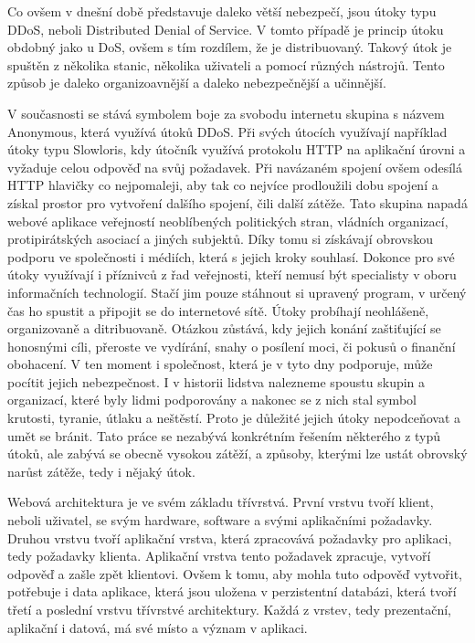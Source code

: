 \documentclass[12pt]{article}
\begin{document}
Co ovšem v dnešní době představuje daleko větší nebezpečí, jsou útoky typu DDoS, neboli Distributed Denial of Service. V tomto případě je princip útoku obdobný jako u DoS, ovšem s tím rozdílem, že je distribuovaný. Takový útok je spuštěn z několika stanic, několika uživateli a pomocí různých nástrojů. Tento způsob je daleko organizoavnější a daleko nebezpečnější a učinnější. \cite{dos}

V současnosti se stává symbolem boje za svobodu internetu skupina s názvem Anonymous, která využívá útoků DDoS. Při svých útocích využívají například útoky typu Slowloris, kdy útočník využívá protokolu HTTP na aplikační úrovni a vyžaduje celou odpověď na svůj požadavek. Při navázaném spojení ovšem odesílá HTTP hlavičky co nejpomaleji, aby tak co nejvíce prodloužili dobu spojení a získal prostor pro vytvoření dalšího spojení, čili další zátěže. Tato skupina napadá webové aplikace veřejností neoblíbených politických stran, vládních organizací, protipirátských asociací a jiných subjektů. Díky tomu si získávají obrovskou podporu ve společnosti i médiích, která s jejich kroky souhlasí. Dokonce pro své útoky využívají i příznivců z řad veřejnosti, kteří nemusí být specialisty v oboru informačních technologií. Stačí jim pouze stáhnout si upravený program, v určený čas ho spustit a připojit se do internetové sítě. Útoky probíhají neohlášeně, organizovaně a ditribuovaně. Otázkou zůstává, kdy jejich konání zaštiťující se honosnými cíli, přeroste ve vydírání, snahy o posílení moci, či pokusů o finanční obohacení. V ten moment i společnost, která je v tyto dny podporuje, může pocítit jejich nebezpečnost. I v historii lidstva nalezneme spoustu skupin a organizací, které byly lidmi podporovány a nakonec se z nich stal symbol krutosti, tyranie, útlaku a neštěstí. Proto je důležité jejich útoky nepodceňovat a umět se bránit. Tato práce se nezabývá konkrétním řešením některého z typů útoků, ale zabývá se obecně vysokou zátěží, a způsoby, kterými lze ustát obrovský narůst zátěže, tedy i nějaký útok.\cite{anonymous}



Webová architektura je ve svém základu třívrstvá. První vrstvu tvoří klient, neboli uživatel, se svým hardware, software a svými aplikačními požadavky. Druhou vrstvu tvoří aplikační vrstva, která zpracovává požadavky pro aplikaci, tedy požadavky klienta. Aplikační vrstva tento požadavek zpracuje, vytvoří odpověď a zašle zpět klientovi. Ovšem k tomu, aby mohla tuto odpověď vytvořit, potřebuje i data aplikace, která jsou uložena v perzistentní databázi, která tvoří třetí a poslední vrstvu třívrstvé architektury. Každá z vrstev, tedy prezentační, aplikační i datová, má své místo a význam v aplikaci.\cite{tri-vrstvy}
\end{document}
